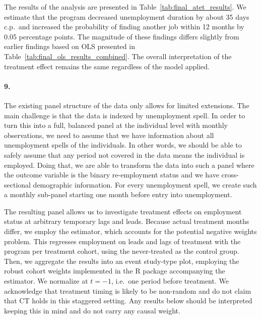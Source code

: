 \documentclass{scrartcl}
\begin{document}
The results of the analysis are presented in Table~\ref{tab:final_atet_results}. We estimate that the program decreased unemployment duration by about 35 days c.p.\ and increased the probability of finding another job within 12 months by 0.05 percentage points. The magnitude of these findings differs slightly from earlier findings based on OLS presented in Table~\ref{tab:final_ols_results_combined}. The overall interpretation of the treatment effect remains the same regardless of the model applied.



\paragraph*{9.}

The existing panel structure of the data only allows for limited extensions. The main challenge is that the data is indexed by unemployment spell. In order to turn this into a full, balanced panel at the individual level with monthly observations, we need to assume that we have information about all unemployment spells of the individuals. In other words, we should be able to safely assume that any period not covered in the data means the individual is employed. Doing that, we are able to transform the data into such a panel where the outcome variable is the binary re-employment status and we have cross-sectional demographic information. For every unemployment spell, we create such a monthly sub-panel starting one month before entry into unemployment. 

The resulting panel allows us to investigate treatment effects on employment status at arbitrary temporary lags and leads. Because actual treatment months differ, we employ the \cite{callawayDifferenceinDifferencesMultipleTime2020} estimator, which accounts for the potential negative weights problem. This regresses employment on leads and lags of treatment with the program per treatment cohort, using the never-treated as the control group. Then, we aggregate the results into an event study-type plot, employing the robust cohort weights implemented in the R package accompanying the estimator. We normalize at $t=-1$, i.e.\ one period before treatment. We acknowledge that treatment timing is likely to be non-random and do not claim that CT holds in this staggered setting. Any results below should be interpreted keeping this in mind and do not carry any causal weight.
\end{document}
